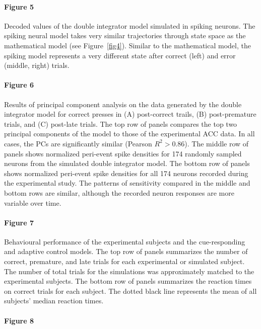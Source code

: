 \documentclass[11pt]{article}
\begin{document}
\paragraph{Figure 5}

Decoded values of the double integrator model
simulated in spiking neurons.
The spiking neural model takes
very similar trajectories through state
space as the mathematical model (see Figure~\ref{fig4}).
Similar to the mathematical model,
the spiking model represents a very different state
after correct (left) and error (middle, right)
trials.

\paragraph{Figure 6}

Results of principal component analysis
on the data generated by the double integrator model
for correct presses in (A) post-correct trails,
(B) post-premature trials, and (C) post-late trials.
The top row of panels compares
the top two principal components
of the model to those of the experimental ACC data.
In all cases, the PCs are significantly similar
(Pearson $R^2 > 0.86$).
The middle row of panels shows normalized
peri-event spike densities
for 174 randomly sampled neurons from the
simulated double integrator model.
The bottom row of panels shows normalized
peri-event spike densities
for all 174 neurons recorded
during the experimental study.
The patterns of sensitivity
compared in the middle and bottom rows
are similar, although the recorded neuron responses
are more variable over time.

\paragraph{Figure 7}

Behavioural performance of the
experimental subjects and
the cue-responding and adaptive control models.
The top row of panels summarizes the number of
correct, premature, and late trials
for each experimental or simulated subject.
The number of total trials
for the simulations was approximately
matched to the experimental subjects.
The bottom row of panels summarizes the reaction times
on correct trials for each subject.
The dotted black line represents
the mean of all subjects' median reaction times.

\paragraph{Figure 8}
\end{document}
